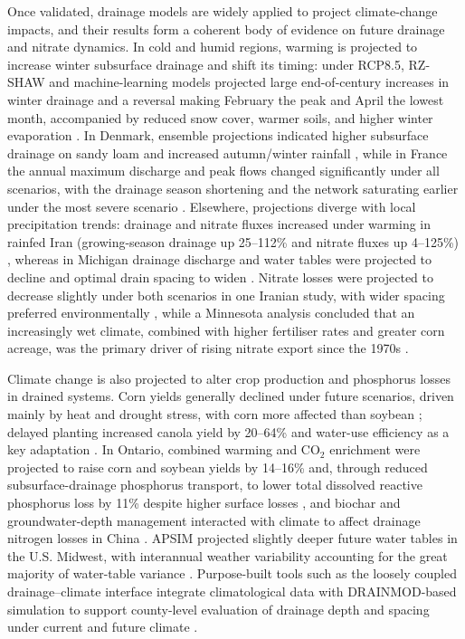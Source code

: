 Once validated, drainage models are widely applied to project climate-change impacts, and their results form a coherent body of evidence on future drainage and nitrate dynamics. In cold and humid regions, warming is projected to increase winter subsurface drainage and shift its timing: under RCP8.5, RZ-SHAW and machine-learning models projected large end-of-century increases in winter drainage and a reversal making February the peak and April the lowest month, accompanied by reduced snow cover, warmer soils, and higher winter evaporation \parencite{Li2025}. In Denmark, ensemble projections indicated higher subsurface drainage on sandy loam and increased autumn/winter rainfall \parencite{Rasmussen2018}, while in France the annual maximum discharge and peak flows changed significantly under all scenarios, with the drainage season shortening and the network saturating earlier under the most severe scenario \parencite{Jeantet2022}. Elsewhere, projections diverge with local precipitation trends: drainage and nitrate fluxes increased under warming in rainfed Iran (growing-season drainage up 25--112\% and nitrate fluxes up 4--125\%) \parencite{Haghnazari2020}, whereas in Michigan drainage discharge and water tables were projected to decline and optimal drain spacing to widen \parencite{Dialameh2025}. Nitrate losses were projected to decrease slightly under both scenarios in one Iranian study, with wider spacing preferred environmentally \parencite{Ziaeifar2025}, while a Minnesota analysis concluded that an increasingly wet climate, combined with higher fertiliser rates and greater corn acreage, was the primary driver of rising nitrate export since the 1970s \parencite{Nangia2010b}.

Climate change is also projected to alter crop production and phosphorus losses in drained systems. Corn yields generally declined under future scenarios, driven mainly by heat and drought stress, with corn more affected than soybean \parencite{Adhikari2020,Dialameh2025,Kanber2019}; delayed planting increased canola yield by 20--64\% and water-use efficiency as a key adaptation \parencite{Asgari2022}. In Ontario, combined warming and CO$_2$ enrichment were projected to raise corn and soybean yields by 14--16\% and, through reduced subsurface-drainage phosphorus transport, to lower total dissolved reactive phosphorus loss by 11\% despite higher surface losses \parencite{Wang2021}, and biochar and groundwater-depth management interacted with climate to affect drainage nitrogen losses in China \parencite{Zhang2022b}. APSIM projected slightly deeper future water tables in the U.S. Midwest, with interannual weather variability accounting for the great majority of water-table variance \parencite{Elli2023}. Purpose-built tools such as the loosely coupled drainage--climate interface integrate climatological data with DRAINMOD-based simulation to support county-level evaluation of drainage depth and spacing under current and future climate \parencite{Adhikari2020}.